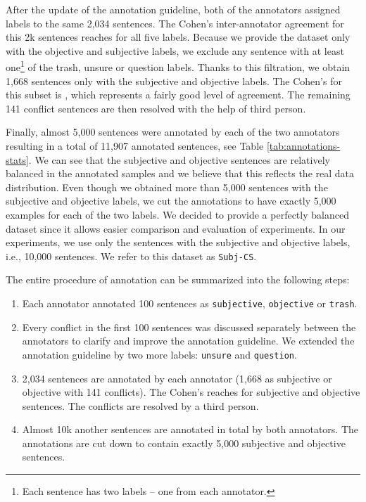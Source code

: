 \documentclass[10pt, a4paper]{article}
\begin{document}
\par After the update of the annotation guideline, both of the annotators assigned labels to the same 2,034 sentences. The Cohen’s  \cite{cohen1960coefficient} inter-annotator agreement for this 2k sentences reaches  for all five labels. Because we provide the dataset only with the objective and subjective labels, we exclude any sentence with at least one\footnote{Each sentence has two labels -- one from each annotator.} of the trash, unsure or question labels. Thanks to this filtration, we obtain 1,668 sentences only with the subjective and objective labels. The Cohen’s  for this subset is , which represents a fairly good level of agreement. The remaining 141 conflict sentences are then resolved with the help of third person.

\par Finally, almost 5,000 sentences were annotated by each of the two annotators resulting in a total of 11,907 annotated sentences, see Table \ref{tab:annotations-stats}. We can see that the subjective and objective sentences are relatively balanced in the annotated samples and we believe that this reflects the real data distribution. Even though we obtained more than 5,000 sentences with the subjective and objective labels, we cut the annotations to have exactly 5,000 examples for each of the two labels. We decided to provide a perfectly balanced dataset since it allows easier comparison and evaluation of experiments. In our experiments, we use only the sentences with the subjective and objective labels, i.e., 10,000 sentences. We refer to this dataset as \texttt{Subj-CS}.

The entire procedure of annotation can be summarized into the following steps:

\begin{enumerate}
    \item Each annotator annotated 100 sentences as \texttt{subjective}, \texttt{objective} or \texttt{trash}.
    
    \item Every conflict in the first 100 sentences was discussed separately between the annotators to clarify and improve the annotation guideline. We extended the annotation guideline by two more labels: \texttt{unsure} and \texttt{question}.
    
    \item 2,034 sentences are annotated by each annotator (1,668 as subjective or objective with 141 conflicts). The Cohen’s  reaches  for subjective and objective sentences. The conflicts are resolved by a third person.
    
    \item Almost 10k another sentences are annotated in total by both annotators. The annotations are cut down to contain exactly 5,000 subjective and objective sentences.
\end{enumerate}
\end{document}
